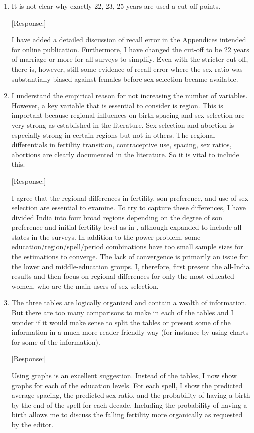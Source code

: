 \documentclass[letterpaper,12pt]{article}
\begin{document}
\begin{enumerate}
\item It is not clear why exactly 22, 23, 25 years are used a cut-off
points.

[Response:]

I have added a detailed discussion of recall error in the Appendices intended for online 
publication.
Furthermore, I have changed the cut-off to be 22 years of marriage or more for all surveys 
to simplify.
Even with the stricter cut-off, there is, however, still some evidence of recall error 
where the sex ratio was substantially biased against females  before sex selection became 
available.


\item I understand the empirical reason for not increasing the number of
variables. However, a key variable that is essential to consider is
region. This is important because regional influences on birth spacing
and sex selection are very strong as established in the literature. Sex
selection and abortion is especially strong in certain regions but not
in others. The regional differentials in fertility transition,
contraceptive use, spacing, sex ratios, abortions are clearly documented
in the literature. So it is vital to include this.

[Response:]

I agree that the regional differences in fertility, son preference, and use 
of sex selection are essential to examine.
To try to capture these differences, I have divided India into four broad regions 
depending on the degree of son preference and initial fertility level as in 
\citet{retherford03b}, although expanded to include all states in the surveys.
In addition to the power problem, some education/region/spell/period combinations have too 
small sample sizes for the estimations to converge.
The lack of convergence is primarily an issue for the lower and middle-education groups.
I, therefore, first present the all-India results and then focus on regional differences
for only the most educated women, who are the main users of sex selection.


\item The three tables are logically organized and contain a wealth of
information. But there are too many comparisons to make in each of the
tables and I wonder if it would make sense to split the tables or
present some of the information in a much more reader friendly way (for
instance by using charts for some of the information). 

[Response:]

Using graphs is an excellent suggestion.
Instead of the tables, I now show graphs for each of the education levels.
For each spell, I show the predicted average spacing, the predicted sex ratio, and the 
probability of having a birth by the end of the spell for each decade.
Including the probability of having a birth allows me to discuss the falling fertility 
more organically as requested by the editor.


\end{enumerate}
\end{document}
